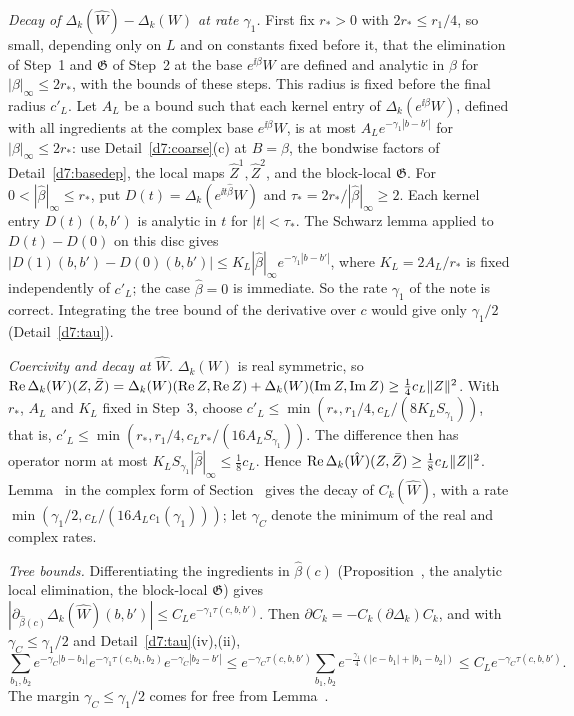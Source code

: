 \begin{detail}
\begin{step}
\emph{Decay of $\Delta_k(\hat W)-\Delta_k(W)$ at rate $\gamma_1$.} First fix $r_*>0$ with $2r_*\le r_1/4$, so small, depending only on $L$ and on constants fixed before it, that the elimination of Step~1 and $\mathfrak G$ of Step~2 at the base $e^{\ii\beta}W$ are defined and analytic in $\beta$ for $|\beta|_\infty\le2r_*$, with the bounds of these steps. This radius is fixed before the final radius $c'_L$. Let $A_L$ be a bound such that each kernel entry of $\Delta_k(e^{\ii\beta}W)$, defined with all ingredients at the complex base $e^{\ii\beta}W$, is at most $A_Le^{-\gamma_1|b-b'|}$ for $|\beta|_\infty\le2r_*$: use Detail~\ref{d7:coarse}(c) at $B=\beta$, the bondwise factors of Detail~\ref{d7:basedep}, the local maps $\hat Z^1,\hat Z^2$, and the block-local $\mathfrak G$. For $0<|\hat\beta|_\infty\le r_*$, put $D(t)=\Delta_k(e^{\ii t\hat\beta}W)$ and $\tau_*=2r_*/|\hat\beta|_\infty\ge2$. Each kernel entry $D(t)(b,b')$ is analytic in $t$ for $|t|<\tau_*$. The Schwarz lemma applied to $D(t)-D(0)$ on this disc gives $|D(1)(b,b')-D(0)(b,b')|\le K_L|\hat\beta|_\infty e^{-\gamma_1|b-b'|}$, where $K_L=2A_L/r_*$ is fixed independently of $c'_L$; the case $\hat\beta=0$ is immediate. So the rate $\gamma_1$ of the note is correct. Integrating the tree bound of the derivative over $c$ would give only $\gamma_1/2$ (Detail~\ref{d7:tau}).
\end{step}
\begin{step}
\emph{Coercivity and decay at $\hat W$.} $\Delta_k(W)$ is real symmetric, so $\operatorname{Re}\Delta_k(W)(Z,\bar Z)=\Delta_k(W)(\operatorname{Re} Z,\operatorname{Re} Z)+\Delta_k(W)(\operatorname{Im}Z,\operatorname{Im}Z)\ge\frac14c_L\|Z\|^2$. With $r_*$, $A_L$ and $K_L$ fixed in Step~3, choose $c'_L\le\min(r_*,r_1/4,c_L/(8K_LS_{\gamma_1}))$, that is, $c'_L\le\min(r_*,r_1/4,c_Lr_*/(16A_LS_{\gamma_1}))$. The difference then has operator norm at most $K_LS_{\gamma_1}|\hat\beta|_\infty\le\frac18c_L$. Hence $\operatorname{Re}\Delta_k(\hat W)(Z,\bar Z)\ge\frac18c_L\|Z\|^2$. Lemma~ in the complex form of Section~ gives the decay of $C_k(\hat W)$, with a rate $\min(\gamma_1/2,c_L/(16A_Lc_1(\gamma_1)))$; let $\gamma_C$ denote the minimum of the real and complex rates.
\end{step}
\begin{step}
\emph{Tree bounds.} Differentiating the ingredients in $\hat\beta(c)$ (Proposition~, the analytic local elimination, the block-local $\mathfrak G$) gives $|\partial_{\hat\beta(c)}\Delta_k(\hat W)(b,b')|\le C_Le^{-\gamma_1\tau(c,b,b')}$. Then $\partial C_k=-C_k(\partial\Delta_k)C_k$, and with $\gamma_C\le\gamma_1/2$ and Detail~\ref{d7:tau}(iv),(ii),
\[
\sum_{b_1,b_2}e^{-\gamma_C|b-b_1|}e^{-\gamma_1\tau(c,b_1,b_2)}e^{-\gamma_C|b_2-b'|}\le e^{-\gamma_C\tau(c,b,b')}\sum_{b_1,b_2}e^{-\frac{\gamma_1}4(|c-b_1|+|b_1-b_2|)}\le C_Le^{-\gamma_C\tau(c,b,b')} .
\]
The margin $\gamma_C\le\gamma_1/2$ comes for free from Lemma~.
\end{step}
\end{detail}

